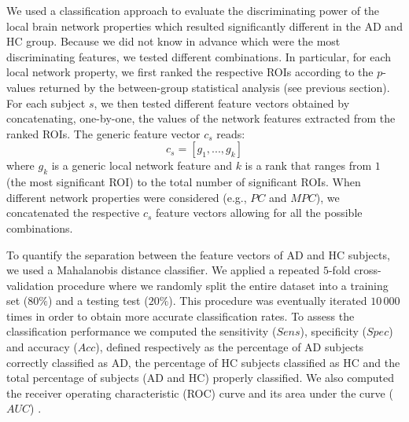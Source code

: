 We used a classification approach to evaluate the discriminating power of the local brain network properties which resulted significantly different in the AD and HC group.
Because we did not know in advance which were the most discriminating features, we tested different combinations. In particular, for each local network property, we first ranked the respective ROIs according to the $p$-values returned by the between-group statistical analysis (see previous section).
For each subject $s$, we then tested different feature vectors obtained by concatenating, one-by-one, the values of the network features extracted from the ranked ROIs.
The generic feature vector $c_s$ reads:
\begin{equation}
	c_s =  [g_1, ... ,g_k]
	\label{eq:caractestics}
\end{equation}
where $g_k$ is a generic local network feature and $k$ is a rank that ranges from $1$ (the most significant ROI) to the total number of significant ROIs.
When different network properties were considered (e.g., $PC$ and $MPC$), we concatenated the respective $c_s$ feature vectors allowing for all the possible combinations.

To quantify the separation between the feature vectors of AD and HC subjects, we used a Mahalanobis distance classifier.
We applied a repeated $5$-fold cross-validation procedure where we randomly split the entire dataset into a training set ($80\%$)  and a testing test ($20\%$). This procedure was eventually iterated $10\,000$ times in order to obtain more accurate classification rates.
To assess the classification performance we computed the sensitivity ($Sens$), specificity ($Spec$) and accuracy ($Acc$), defined respectively as the percentage of AD subjects correctly classified as AD, the percentage of HC subjects classified as HC and the total percentage of subjects (AD and HC) properly classified.
We also computed the receiver operating characteristic (ROC) curve and its area under the curve ($AUC$) \citep{hastie_elements_2009}.

